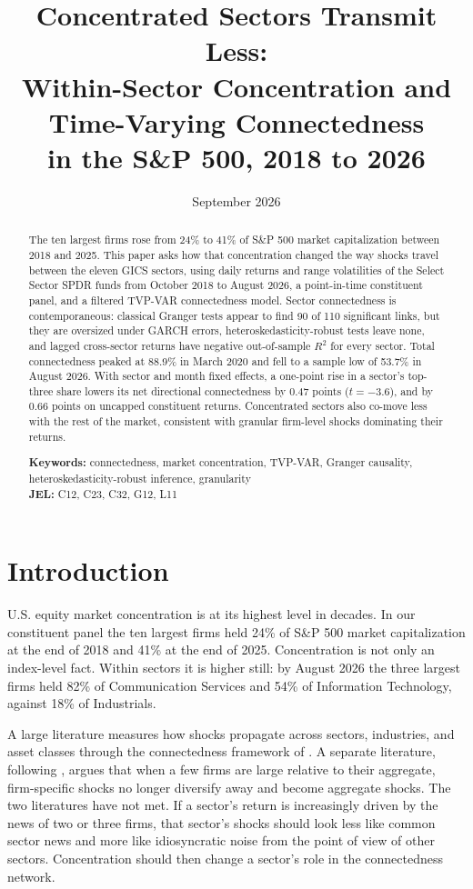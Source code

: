 \documentclass[11pt]{article}
\title{Concentrated Sectors Transmit Less:\\Within-Sector Concentration and Time-Varying Connectedness\\in the S\&P 500, 2018 to 2026}
\author{}
\date{September 2026}
\begin{document}
\maketitle

\begin{abstract}
\noindent
The ten largest firms rose from 24\% to 41\% of S\&P 500 market capitalization between 2018 and 2025. This paper asks how that concentration changed the way shocks travel between the eleven GICS sectors, using daily returns and range volatilities of the Select Sector SPDR funds from October 2018 to August 2026, a point-in-time constituent panel, and a filtered TVP-VAR connectedness model. Sector connectedness is contemporaneous: classical Granger tests appear to find 90 of 110 significant links, but they are oversized under GARCH errors, heteroskedasticity-robust tests leave none, and lagged cross-sector returns have negative out-of-sample $R^2$ for every sector. Total connectedness peaked at 88.9\% in March 2020 and fell to a sample low of 53.7\% in August 2026. With sector and month fixed effects, a one-point rise in a sector's top-three share lowers its net directional connectedness by 0.47 points ($t=-3.6$), and by 0.66 points on uncapped constituent returns. Concentrated sectors also co-move less with the rest of the market, consistent with granular firm-level shocks dominating their returns.

\medskip
\noindent\textbf{Keywords:} connectedness, market concentration, TVP-VAR, Granger causality, heteroskedasticity-robust inference, granularity
\\\noindent\textbf{JEL:} C12, C23, C32, G12, L11
\end{abstract}

\newpage
\section{Introduction}

U.S. equity market concentration is at its highest level in decades. In our constituent panel the ten largest firms held 24\% of S\&P 500 market capitalization at the end of 2018 and 41\% at the end of 2025. Concentration is not only an index-level fact. Within sectors it is higher still: by August 2026 the three largest firms held 82\% of Communication Services and 54\% of Information Technology, against 18\% of Industrials.

A large literature measures how shocks propagate across sectors, industries, and asset classes through the connectedness framework of \citet{diebold2009, diebold2012, diebold2014}. A separate literature, following \citet{gabaix2011}, argues that when a few firms are large relative to their aggregate, firm-specific shocks no longer diversify away and become aggregate shocks. The two literatures have not met. If a sector's return is increasingly driven by the news of two or three firms, that sector's shocks should look less like common sector news and more like idiosyncratic noise from the point of view of other sectors. Concentration should then change a sector's role in the connectedness network.
\end{document}
